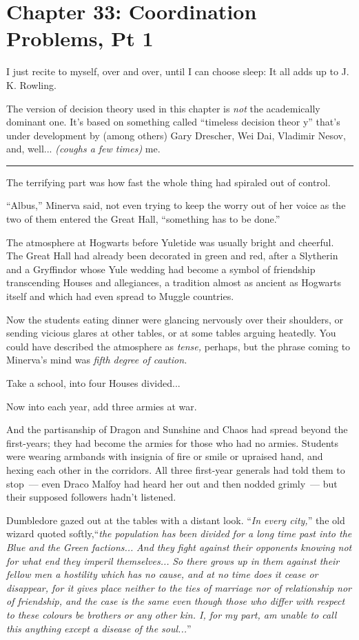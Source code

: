 \chapter{Chapter 33: Coordination Problems, Pt 1}
I just recite to myself, over and over, until I can choose sleep: It all adds up to J. K. Rowling.

The version of decision theory used in this chapter is \emph{not} the academically dominant one. It's based on something called ``timeless decision theor y'' that's under development by (among others) Gary Drescher, Wei Dai, Vladimir Nesov, and, well... \emph{(coughs a few times)} me.

\begin{center}\rule{3in}{0.4pt}\end{center}

The terrifying part was how fast the whole thing had spiraled out of control.

``Albus,'' Minerva said, not even trying to keep the worry out of her voice as the two of them entered the Great Hall, ``something has to be done.''

The atmosphere at Hogwarts before Yuletide was usually bright and cheerful. The Great Hall had already been decorated in green and red, after a Slytherin and a Gryffindor whose Yule wedding had become a symbol of friendship transcending Houses and allegiances, a tradition almost as ancient as Hogwarts itself and which had even spread to Muggle countries.

Now the students eating dinner were glancing nervously over their shoulders, or sending vicious glares at other tables, or at some tables arguing heatedly. You could have described the atmosphere as \emph{tense,} perhaps, but the phrase coming to Minerva's mind was \emph{fifth degree of caution.}

Take a school, into four Houses divided...

Now into each year, add three armies at war.

And the partisanship of Dragon and Sunshine and Chaos had spread beyond the first-years; they had become the armies for those who had no armies. Students were wearing armbands with insignia of fire or smile or upraised hand, and hexing each other in the corridors. All three first-year generals had told them to stop~--- even Draco Malfoy had heard her out and then nodded grimly~--- but their supposed followers hadn't listened.

Dumbledore gazed out at the tables with a distant look. ``\emph{In every city,}'' the old wizard quoted softly,``\emph{the population has been divided for a long time past into the Blue and the Green factions...} \emph{And they fight against their opponents knowing not for what end they imperil themselves...} \emph{So there grows up in them against their fellow men a hostility which has no cause, and at no time does it cease or disappear, for it gives place neither to the ties of marriage nor of relationship nor of friendship, and the case is the same even though those who differ with respect to these colours be brothers or any other kin. I, for my part, am unable to call this anything except a disease of the soul...}''

